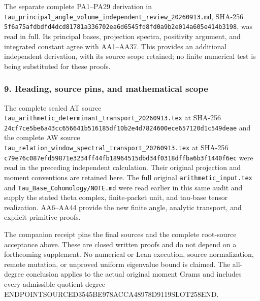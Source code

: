 The separate complete PA1--PA29 derivation in \texttt{tau\_principal\_angle\_volume\_independent\_review\_20260913.md}, SHA-256 \texttt{5f6a75afdbdfd4dcd81781a336702ea6d6545fd8fd0a9b2e014a605e414b3198}, was read in full. Its principal bases, projection spectra, positivity argument, and integrated constant agree with AA1--AA37. This provides an additional independent derivation, with its source scope retained; no finite numerical test is being substituted for these proofs.

\subsubsection{9. Reading, source pins, and mathematical scope}\label{endpoint-all_degree_angle_review--reading-source-pins-and-mathematical-scope}

The complete sealed AT source \texttt{tau\_arithmetic\_determinant\_transport\_20260913.tex} at SHA-256 \texttt{24cf7ce5be6a43cc656641b516185df10b2e4d7824600ece657120d1c549deae} and the complete AW source \texttt{tau\_relation\_window\_spectral\_transport\_20260913.tex} at SHA-256 \texttt{c79e76c087efd59871e3234ff44fb18964515dbd34f0318dffba6b3f1440f6ec} were read in the preceding independent calculation. Their original projection and moment conventions are retained here. The full original \texttt{arithmetic\_input.tex} and \texttt{Tau\_Base\_Cohomology/NOTE.md} were read earlier in this same audit and supply the stated theta complex, finite-packet unit, and tau-base tensor realization. AA6--AA44 provide the new finite angle, analytic transport, and explicit primitive proofs.

The companion receipt pins the final sources and the complete root-source acceptance above. These are closed written proofs and do not depend on a forthcoming supplement. No numerical or Lean execution, source normalization, remote mutation, or unproved uniform eigenvalue bound is claimed. The all-degree conclusion applies to the actual original moment Grams and includes every admissible quotient degree ENDPOINTSOURCED3545BE978ACCA48978D9119SLOT258END.
